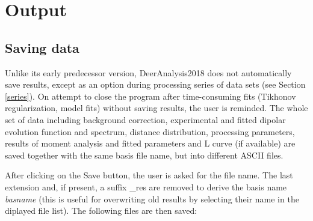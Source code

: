 \documentclass{article}
\begin{document}
\section{Output}
\subsection{Saving data}
\label{output}
Unlike its early predecessor version, DeerAnalysis2018 does not automatically save results, except as an option during processing series of data sets (see Section \ref{series}). On attempt to close the program after time-consuming fits (Tikhonov regularization, model fits) without saving results, the user is reminded. The whole set of data including background correction, experimental and fitted dipolar evolution function and spectrum, distance distribution, processing parameters, results of moment analysis and fitted parameters and L curve (if available) are saved together with the same basis file name, but into different ASCII files. 

After clicking on the {\ttfamily Save} button, the user is asked for the file name. The last extension and, if present, a suffix {\ttfamily \_res} are removed to derive the basis name {\ttfamily \emph{basname}} (this is useful for overwriting old results by selecting their name in the diplayed file list). The following files are then saved:
\end{document}
